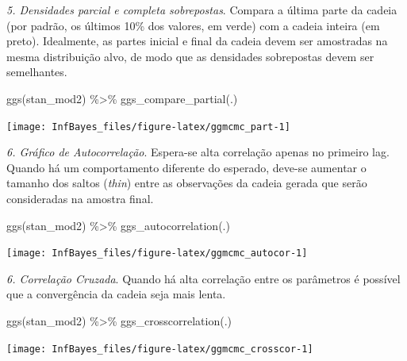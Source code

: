 \documentclass[
]{book}
\newenvironment{Shaded}{\begin{snugshade}}{\end{snugshade}}
\newcommand{\FunctionTok}[1]{\textcolor[rgb]{0.00,0.00,0.00}{#1}}
\newcommand{\NormalTok}[1]{#1}
\newcommand{\SpecialCharTok}[1]{\textcolor[rgb]{0.00,0.00,0.00}{#1}}
\begin{document}
\emph{5. Densidades parcial e completa sobrepostas}. Compara a última parte da cadeia (por padrão, os últimos 10\% dos valores, em verde) com a cadeia inteira (em preto). Idealmente, as partes inicial e final da cadeia devem ser amostradas na mesma distribuição alvo, de modo que as densidades sobrepostas devem ser semelhantes.

\begin{Shaded}
\begin{Highlighting}[]
\FunctionTok{ggs}\NormalTok{(stan\_mod2) }\SpecialCharTok{\%\textgreater{}\%} \FunctionTok{ggs\_compare\_partial}\NormalTok{(.)}
\end{Highlighting}
\end{Shaded}

\begin{center}\texttt{[image: InfBayes\_files/figure-latex/ggmcmc\_part-1]} \end{center}

\emph{6. Gráfico de Autocorrelação}. Espera-se alta correlação apenas no primeiro lag. Quando há um comportamento diferente do esperado, deve-se aumentar o tamanho dos saltos (\emph{thin}) entre as observações da cadeia gerada que serão consideradas na amostra final.

\begin{Shaded}
\begin{Highlighting}[]
\FunctionTok{ggs}\NormalTok{(stan\_mod2) }\SpecialCharTok{\%\textgreater{}\%} \FunctionTok{ggs\_autocorrelation}\NormalTok{(.)}
\end{Highlighting}
\end{Shaded}

\begin{center}\texttt{[image: InfBayes\_files/figure-latex/ggmcmc\_autocor-1]} \end{center}

\emph{6. Correlação Cruzada}. Quando há alta correlação entre os parâmetros é possível que a convergência da cadeia seja mais lenta.

\begin{Shaded}
\begin{Highlighting}[]
\FunctionTok{ggs}\NormalTok{(stan\_mod2) }\SpecialCharTok{\%\textgreater{}\%} \FunctionTok{ggs\_crosscorrelation}\NormalTok{(.)}
\end{Highlighting}
\end{Shaded}

\begin{center}\texttt{[image: InfBayes\_files/figure-latex/ggmcmc\_crosscor-1]} \end{center}
\end{document}
